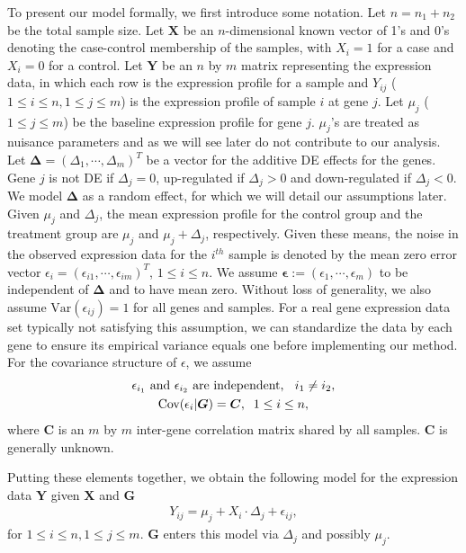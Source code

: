 \documentclass[a4,center,fleqn]{NAR}
\begin{document}
	To present our model formally, we first introduce some notation. Let $n=n_1+n_2$ be the total
	sample size. Let $\bm X$ be an $n$-dimensional known vector of 1's and 0's denoting the case-control
	membership of the samples, with $X_i=1$ for a case and $X_i=0$ for a control. Let $\bm Y$ be an $n$
	by $m$ matrix representing the expression data, in which each row is the expression profile for a
	sample and $Y_{ij}$ ($1\le i\le n, 1\le j\le m$) is the expression profile of sample $i$ at gene
	$j$. Let $\mu_j$ ($1\le j\le m$) be the baseline expression profile for gene $j$. $\mu_j$'s are
	treated as nuisance parameters and as we will see later do not contribute to our analysis. Let $\bm
	\Delta=(\Delta_1, \cdots, \Delta_m)^T$ be a vector for the additive DE effects for the genes. Gene
	$j$ is not DE if $\Delta_j=0$, up-regulated if $\Delta_j >0 $ and down-regulated if $\Delta_j<0$. We
	model $\bm \Delta$ as a random effect, for which we will detail our assumptions later. Given $\mu_j$
	and $\Delta_j$, the mean expression profile for the control group and the treatment group are
	$\mu_j$ and $\mu_j+\Delta_j$, respectively. Given these means, the noise in the observed expression
	data for the $i^{th}$ sample is denoted by the mean zero error vector
	$\epsilon_i=(\epsilon_{i1},\cdots,\epsilon_{im})^T$, $1\le i\le n$. We assume
	$\bm\epsilon:=(\epsilon_1,\cdots,\epsilon_m)$ to be independent of $\bm \Delta$ and to have mean
	zero. Without loss of generality, we also assume $\mbox{Var}(\epsilon_{ij})=1$ for all genes and
	samples. For a real gene expression data set typically not satisfying this assumption, we can
	standardize the data by each gene to ensure its empirical variance equals one before implementing
	our method. For the covariance structure of $\epsilon$, we assume 
	\begin{gather}
	\text{$\epsilon_{i_1}$ and $\epsilon_{i_2}$ are independent, \;\;$i_1\ne
		i_2$},\label{eq:gene_indep}\\
	\mbox{Cov}(\epsilon_i|\bm G)=\bm C, \;\;1\le i\le n,\label{eq:gene_cor}
	\end{gather}
	where $\bm C$ is an $m$ by $m$ inter-gene correlation matrix shared by all samples. $\bm C$ is
	generally unknown.
	
	Putting these elements together, we obtain the following model for the expression data $\bm Y$
	given $\bm X$ and $\bm G$ 
	\begin{align}
	\label{eq:Ymodel}
	Y_{ij} = \mu_j + X_i\cdot\Delta_j + \epsilon_{ij},
	\end{align}
	for $1\le i\le n, 1\le j\le m$. $\bm G$ enters this model via $\Delta_j$ and possibly $\mu_j$.
	
\end{document}
